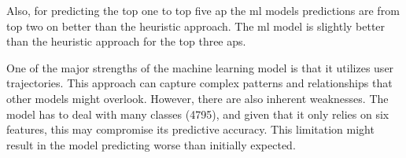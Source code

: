 Also, for predicting the top one to top five \ac{ap} the \ac{ml} models predictions are from top two on better than the heuristic approach.
The \ac{ml} model is slightly better than the heuristic approach for the top three \acp{ap}.


One of the major strengths of the machine learning model is that it utilizes user trajectories.
This approach can capture complex patterns and relationships that other models might overlook.
However, there are also inherent weaknesses.
The model has to deal with many classes (4795), and given that it only relies on six features, this may compromise its predictive accuracy.
This limitation might result in the model predicting worse than initially expected.